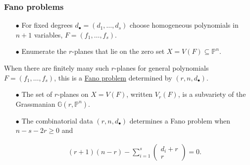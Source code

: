 \documentclass{beamer}
\theoremstyle{definition}
\newcommand{\blue}[1]{{\color{black!10!blue}\underline{#1}}}
\begin{document}
\begin{frame}
\frametitle{Fano problems}
\begin{enumerate}
\item[$\bullet$] For fixed degrees $d_\bullet = (d_1,\dotsc,d_s)$ choose homogeneous polynomials in $n+1$ variables, $F = (f_1,\dotsc,f_s)$.

\item[$\bullet$] Enumerate the $r$-planes that lie on the zero set $X = V(F)\subseteq\mathbb{P}^n$.
\end{enumerate}

When there are finitely many such $r$-planes for general polynomials $F = (f_1,\dotsc,f_s)$, this is a \blue{Fano problem} determined by $(r,n,d_\bullet)$.

\begin{enumerate}
\pause

\item[$\bullet$] The set of $r$-planes on $X=V(F)$, written $V_r(F)$, is a subvariety of the Grassmanian $\mathbb{G}(r,\mathbb{P}^n)$.

\pause

\item[$\bullet$] The combinatorial data $(r,n,d_\bullet)$ determines a Fano problem when $n-s-2r\ge 0$ and

\vspace{-.8cm}

\begin{align*}
(r+1)(n-r) - \sum_{i=1}^s \left(\begin{smallmatrix}d_i + r\\r\end{smallmatrix}\right)=0.
\end{align*}
\end{enumerate}

\end{frame}
\end{document}
